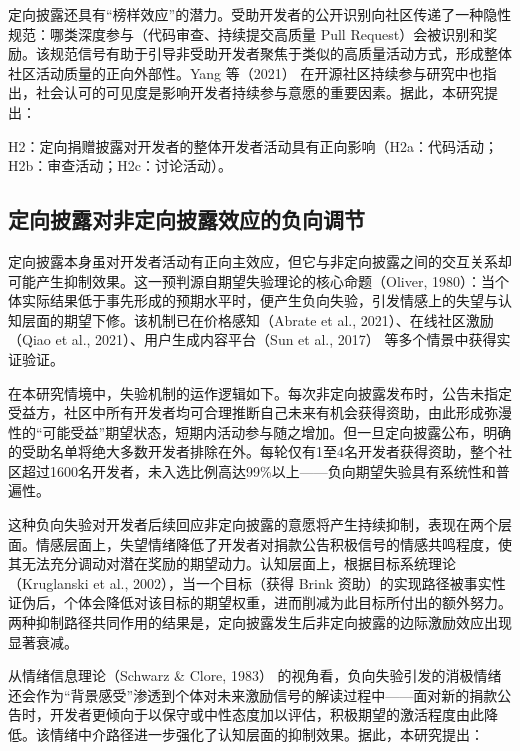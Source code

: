 \documentclass[
    type = master, %
    degree = professional,        %
    decl-page,  %
    twoside,                %
    fontset = fandol %
  ]{njuthesis}
\begin{document}
定向披露还具有“榜样效应”的潜力。受助开发者的公开识别向社区传递了一种隐性规范：哪类深度参与（代码审查、持续提交高质量 Pull Request）会被识别和奖励。该规范信号有助于引导非受助开发者聚焦于类似的高质量活动方式，形成整体社区活动质量的正向外部性。Yang 等（2021）\cite{yang2021differential} 在开源社区持续参与研究中也指出，社会认可的可见度是影响开发者持续参与意愿的重要因素。据此，本研究提出：

H2：定向捐赠披露对开发者的整体开发者活动具有正向影响（H2a：代码活动；H2b：审查活动；H2c：讨论活动）。

\subsection{定向披露对非定向披露效应的负向调节}

定向披露本身虽对开发者活动有正向主效应，但它与非定向披露之间的交互关系却可能产生抑制效果。这一预判源自期望失验理论的核心命题（Oliver, 1980）\cite{oliver1980cognitive}：当个体实际结果低于事先形成的预期水平时，便产生负向失验，引发情感上的失望与认知层面的期望下修。该机制已在价格感知（Abrate et al., 2021）\cite{abrate2021relationship}、在线社区激励（Qiao et al., 2021）\cite{qiao2021mitigating}、用户生成内容平台（Sun et al., 2017）\cite{sun2017motivation} 等多个情景中获得实证验证。

在本研究情境中，失验机制的运作逻辑如下。每次非定向披露发布时，公告未指定受益方，社区中所有开发者均可合理推断自己未来有机会获得资助，由此形成弥漫性的“可能受益”期望状态，短期内活动参与随之增加。但一旦定向披露公布，明确的受助名单将绝大多数开发者排除在外。每轮仅有1至4名开发者获得资助，整个社区超过1600名开发者，未入选比例高达99\%以上——负向期望失验具有系统性和普遍性。

这种负向失验对开发者后续回应非定向披露的意愿将产生持续抑制，表现在两个层面。情感层面上，失望情绪降低了开发者对捐款公告积极信号的情感共鸣程度，使其无法充分调动对潜在奖励的期望动力。认知层面上，根据目标系统理论（Kruglanski et al., 2002）\cite{kruglanski2002theory}，当一个目标（获得 Brink 资助）的实现路径被事实性证伪后，个体会降低对该目标的期望权重，进而削减为此目标所付出的额外努力。两种抑制路径共同作用的结果是，定向披露发生后非定向披露的边际激励效应出现显著衰减。

从情绪信息理论（Schwarz \& Clore, 1983）\cite{schwarz1983moods} 的视角看，负向失验引发的消极情绪还会作为“背景感受”渗透到个体对未来激励信号的解读过程中——面对新的捐款公告时，开发者更倾向于以保守或中性态度加以评估，积极期望的激活程度由此降低。该情绪中介路径进一步强化了认知层面的抑制效果。据此，本研究提出：
\end{document}
